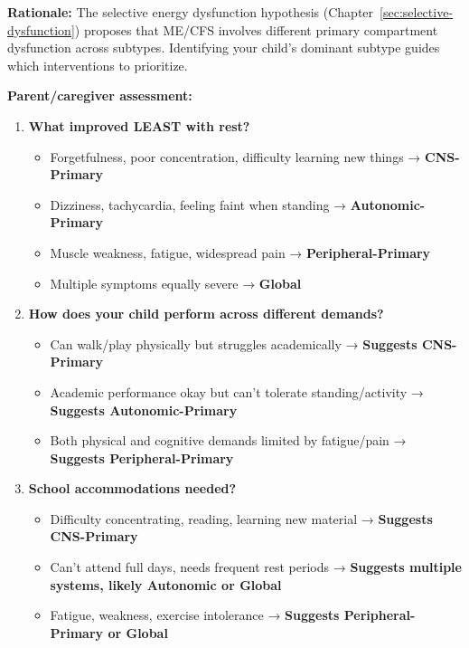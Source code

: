\begin{recommendation}
\label{rec:ped-ambulatory-subtype}

\textbf{Rationale:} The selective energy dysfunction hypothesis (Chapter~\ref{sec:selective-dysfunction}) proposes that ME/CFS involves different primary compartment dysfunction across subtypes. Identifying your child's dominant subtype guides which interventions to prioritize.

\textbf{Parent/caregiver assessment:}

\begin{enumerate}
    \item \textbf{What improved LEAST with rest?}
    \begin{itemize}
        \item Forgetfulness, poor concentration, difficulty learning new things → \textbf{CNS-Primary}
        \item Dizziness, tachycardia, feeling faint when standing → \textbf{Autonomic-Primary}
        \item Muscle weakness, fatigue, widespread pain → \textbf{Peripheral-Primary}
        \item Multiple symptoms equally severe → \textbf{Global}
    \end{itemize}

    \item \textbf{How does your child perform across different demands?}
    \begin{itemize}
        \item Can walk/play physically but struggles academically → \textbf{Suggests CNS-Primary}
        \item Academic performance okay but can't tolerate standing/activity → \textbf{Suggests Autonomic-Primary}
        \item Both physical and cognitive demands limited by fatigue/pain → \textbf{Suggests Peripheral-Primary}
    \end{itemize}

    \item \textbf{School accommodations needed?}
    \begin{itemize}
        \item Difficulty concentrating, reading, learning new material → \textbf{Suggests CNS-Primary}
        \item Can't attend full days, needs frequent rest periods → \textbf{Suggests multiple systems, likely Autonomic or Global}
        \item Fatigue, weakness, exercise intolerance → \textbf{Suggests Peripheral-Primary or Global}
    \end{itemize}
\end{enumerate}


\end{recommendation}
